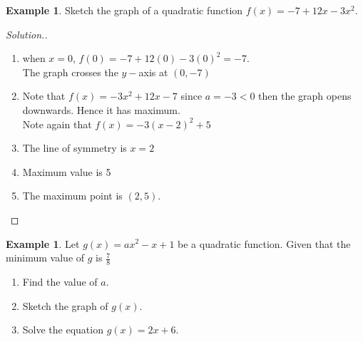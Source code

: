 \documentclass[11pt,a4paper]{article}
\theoremstyle{definition}
\newtheorem{example}[thm]{Example}
\newenvironment{solution}
  {\renewcommand{\qedsymbol}{}\begin{proof}[\textit{Solution}.]}
  {\end{proof}}
\begin{document}
\begin{example}

Sketch the graph of a quadratic function $f(x)=-7+12x-3x^2$.
\end{example}
\begin{solution}

\begin{enumerate}
\item when $x=0$, $f(0)=-7+12(0)-3(0)^2=-7$.\\
The graph crosses the $y-$axis at $(0,-7)$
\item Note that $f(x)=-3x^2+12x-7$ since $a=-3<0$ then the graph opens downwards. Hence it has maximum.\\
Note again that $f(x)=-3(x-2)^2+5$
\item The line of symmetry is $x=2$
\item Maximum value is 5
\item The maximum point is $(2,5)$.\\


\begin{figure}[H]
\centering
{}
\end{figure}

\end{enumerate}
\end{solution}
\begin{example}

Let $g(x)=ax^2-x+1$ be a quadratic function. Given that the minimum value of $g$ is $\frac{7}{8}$
\begin{enumerate}
\item Find the value of $a$.
\item Sketch the graph of $g(x)$.
\item Solve the equation $g(x)=2x+6$.\\
\end{enumerate}
\end{example}
\end{document}

